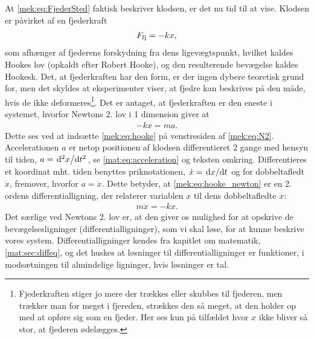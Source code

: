 \begin{example}
At \cref{mek:eq:FjederSted} faktisk beskriver klodsen, er det nu tid til at vise. Klodsen er påvirket af en fjederkraft
%
\begin{align} \label{mek:eq:hooke}
    F_\textup{fj} = -kx,
\end{align}
%
som afhænger af fjederens forskydning fra dens ligevægtspunkt, hvilket kaldes Hookes lov (opkaldt efter Robert Hooke), og den resulterende bevægelse kaldes Hookesk. Det, at fjederkraften har den form, er der ingen dybere teoretisk grund for, men det skyldes at eksperimenter viser, at fjedre kan beskrives på den måde, hvis de ikke deformeres\footnote{Fjederkraften stiger jo mere der trækkes eller skubbes til fjederen, men trækker man for meget i fjereden, strækkes den så meget, at den holder op med at opføre sig som en fjeder. Her ses kun på tilfældet hvor $x$ ikke bliver så stor, at fjederen ødelægges.}. Det er antaget, at fjederkraften er den eneste i systemet, hvorfor Newtons 2. lov i 1 dimension giver at
%
\begin{align} \label{mek:eq:hooke_newton}
    -kx = ma.
\end{align}
%
Dette ses ved at indsætte \cref{mek:eq:hooke} på venstresiden af \cref{mek:eq:N2}. Accelerationen $a$ er netop positionen af klodsen differentieret 2 gange med hensyn til tiden, $a = \dv*[2]{x}{t}$, se \cref{mat:eq:acceleration} og teksten omkring. Differentieres et koordinat mht. tiden benyttes priknotationen, $\dot{x} = \dv*{x}{t}$ og for dobbeltafledt $\ddot{x}$, fremover, hvorfor $a = \ddot{x}$. Dette betyder, at \cref{mek:eq:hooke_newton} er en 2. ordens differentialligning, der relaterer variablen $x$ til dens dobbeltafledte $\ddot{x}$:
%
\begin{align} \label{mek:eq:FjederDiffLign}
	m\ddot{x} = -kx.
\end{align}
%
Det særlige ved Newtons 2. lov er, at den giver os mulighed for at opskrive de bevægelsesligninger (differentialligninger), som vi skal løse, for at kunne beskrive vores system. Differentialligninger kendes fra kapitlet om matematik, \cref{mat:sec:diffeq}, og det huskes at løsninger til differentialligninger er funktioner, i modsætningen til almindelige ligninger, hvis løsninger er tal.

\end{example}
